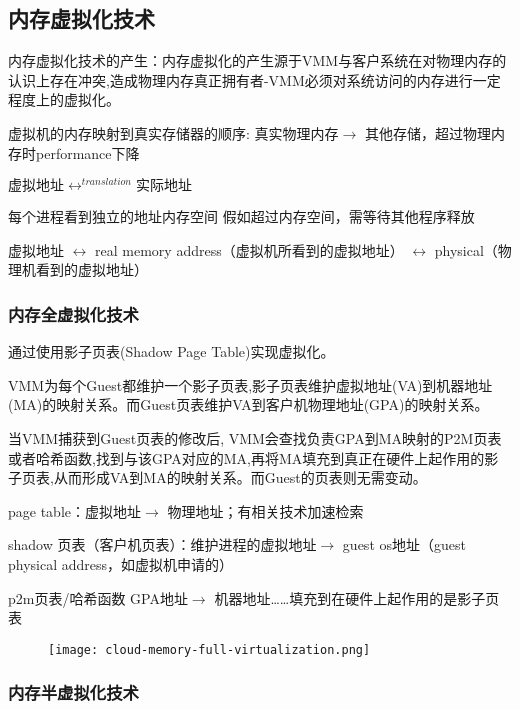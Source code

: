 \subsection{内存虚拟化技术}

内存虚拟化技术的产生：内存虚拟化的产生源于VMM与客户系统在对物理内存的认识上存在冲突,造成物理内存真正拥有者-VMM必须对系统访问的内存进行一定程度上的虚拟化。

虚拟机的内存映射到真实存储器的顺序: 真实物理内存$\rightarrow$ 其他存储，️超过物理内存时performance下降

$虚拟地址\leftrightarrow^{translation}实际地址$

每个进程看到独立的地址内存空间
假如超过内存空间，需等待其他程序释放

虚拟地址 $\leftrightarrow$ real memory address（虚拟机所看到的虚拟地址） $\leftrightarrow$ physical（物理机看到的虚拟地址）

\subsubsection{内存全虚拟化技术}

通过使用影子页表(Shadow Page Table)实现虚拟化。

VMM为每个Guest都维护一个影子页表,影子页表维护虚拟地址(VA)到机器地址(MA)的映射关系。而Guest页表维护VA到客户机物理地址(GPA)的映射关系。

当VMM捕获到Guest页表的修改后, VMM会查找负责GPA到MA映射的P2M页表或者哈希函数,找到与该GPA对应的MA,再将MA填充到真正在硬件上起作用的影子页表,从而形成VA到MA的映射关系。而Guest的页表则无需变动。

page table：虚拟地址$\rightarrow$ 物理地址；有相关技术加速检索

shadow 页表（客户机页表）：维护进程的虚拟地址$\rightarrow$ guest os地址（guest physical address，如虚拟机申请的）

p2m页表/哈希函数 GPA地址$\rightarrow$ 机器地址……填充到在硬件上起作用的是影子页表


\begin{figure}[htbp]
    \begin{center}
        \texttt{[image: cloud-memory-full-virtualization.png]}
    \end{center}
\end{figure}


\subsubsection{内存半虚拟化技术}

